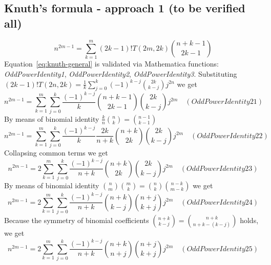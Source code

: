 \subsection{Knuth's formula - approach 1 (to be verified all)}\label{subsec:knuth's-formula---approach-1-(to-be-verified-all)}
\begin{equation}
    n^{2m-1} = \sum_{k=1}^{m} (2k-1)! T(2m,2k) \binom{n+k-1}{2k-1}\label{eq:knuth-general}
\end{equation}
Equation~\eqref{eq:knuth-general} is validated via Mathematica functions:
    \textit{OddPowerIdentity1}, \textit{OddPowerIdentity2}, \textit{OddPowerIdentity3}.
Substituting $(2k-1)! T(2n,2k) = \frac{1}{k} \sum_{j=0}^{k} (-1)^{k-j} \binom{2k}{k-j} j^{2n}$ we get
\begin{equation*}
    n^{2m-1} = \sum_{k=1}^{m} \sum_{j=0}^{k} \frac{(-1)^{k-j}}{k} \binom{n+k-1}{2k-1} \binom{2k}{k-j} j^{2m} \quad
    (OddPowerIdentity21)
\end{equation*}
By means of binomial identity $\frac{k}{n} \binom{n}{k} = \binom{n-1}{k-1}$
\begin{equation*}
    n^{2m-1} = \sum_{k=1}^{m} \sum_{j=0}^{k} \frac{(-1)^{k-j}}{k} \frac{2k}{n+k} \binom{n+k}{2k} \binom{2k}{k-j} j^{2m} \quad
    (OddPowerIdentity22)
\end{equation*}
Collapsing common terms we get
\begin{equation*}
    n^{2m-1} = 2\sum_{k=1}^{m} \sum_{j=0}^{k} \frac{(-1)^{k-j}}{n+k} \binom{n+k}{2k} \binom{2k}{k-j} j^{2m} \quad
    (OddPowerIdentity23)
\end{equation*}
By means of binomial identity $\binom{n}{m} \binom{m}{k} = \binom{n}{k} \binom{n-k}{m-k}$ we get
\begin{equation*}
    n^{2m-1} = 2\sum_{k=1}^{m} \sum_{j=0}^{k} \frac{(-1)^{k-j}}{n+k} \binom{n+k}{k-j} \binom{n+j}{k+j} j^{2m} \quad
    (OddPowerIdentity24)
\end{equation*}
Because the symmetry of binomial coefficients $\binom{n+k}{k-j} = \binom{n+k}{n+k-(k-j)}$ holds, we get
\begin{equation*}
    n^{2m-1} = 2\sum_{k=1}^{m} \sum_{j=0}^{k} \frac{(-1)^{k-j}}{n+k} \binom{n+k}{n+j} \binom{n+j}{k+j} j^{2m} \quad
    (OddPowerIdentity25)
\end{equation*}


